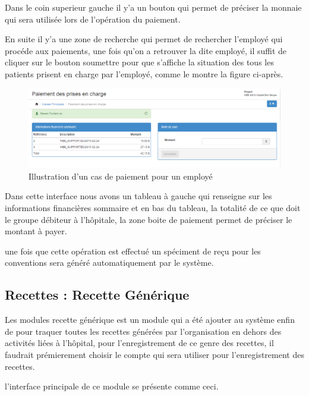 \documentclass[12pt,a4paper]{report}
\begin{document}
Dans le coin superieur gauche il y'a un bouton qui permet de préciser la monnaie qui sera utilisée lors de l'opération du paiement.

En suite il y'a une zone de recherche qui permet de rechercher l'employé qui procéde aux paiements, une fois qu'on a retrouver la dite employé, il suffit de cliquer sur le bouton soumettre pour que s'affiche la situation des tous les patients prisent en charge par l'employé, comme le montre la figure ci-après.


\begin{figure}[h]
\begin{center}
\includegraphics[width=14cm]{pic/PaiemPriseChargeEmploy.png}
\end{center}
\caption{Illustration d'un cas de paiement pour un employé}
\label{Illustration d'un cas de paiement pour un employé}
\end{figure}
 
Dans cette interface nous avons un tableau à gauche qui renseigne sur les informations financières sommaire et en bas du tableau, la totalité de ce que doit le groupe débiteur à l'hôpitale, la zone boite de paiement permet de préciser le montant à payer.

une fois que cette opération est effectué un spéciment de reçu pour les conventions sera généré automatiquement par le système.

\newpage
\subsection{Recettes : Recette Générique}
Les modules recette générique est un module qui a été ajouter au système enfin de pour traquer toutes les recettes générées par l'organisation en dehors des activités liées à l'hôpital, pour l'enregistrement de ce genre des recettes, il faudrait prémierement choisir le compte qui sera utiliser pour l'enregistrement des recettes.

l'interface principale de ce module se présente comme ceci.
\end{document}
